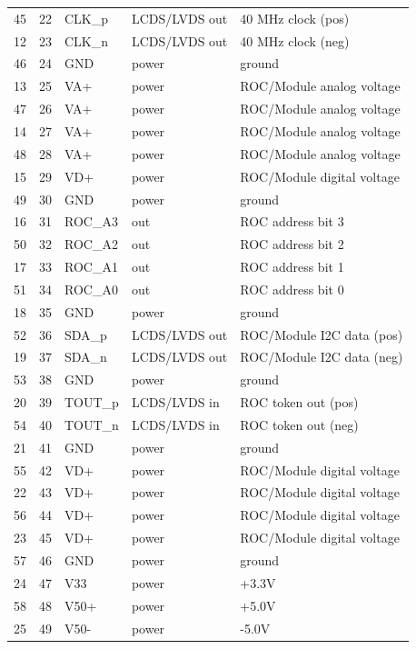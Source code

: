 \begin{table}[p]
{\begin{longtable}{cclll}
	    45 & 22 & CLK\_p & LCDS/LVDS out & 40 MHz clock (pos) \\ 
	    12 & 23 & CLK\_n & LCDS/LVDS out & 40 MHz clock (neg) \\ 
	    46 & 24 & GND & power & ground \\ 
	    13 & 25 & VA+ & power & ROC/Module analog voltage \\ 
	    47 & 26 & VA+ & power & ROC/Module analog voltage \\ 
	    14 & 27 & VA+ & power & ROC/Module analog voltage \\ 
	    48 & 28 & VA+ & power & ROC/Module analog voltage \\ 
	    15 & 29 & VD+ & power & ROC/Module digital voltage \\ 
	    49 & 30 & GND & power & ground \\ 
	    16 & 31 & ROC\_A3 & out & ROC address bit 3 \\ 
	    50 & 32 & ROC\_A2 & out & ROC address bit 2 \\ 
	    17 & 33 & ROC\_A1 & out & ROC address bit 1 \\ 
	    51 & 34 & ROC\_A0 & out & ROC address bit 0 \\ 
	    18 & 35 & GND & power & ground \\ 
	    52 & 36 & SDA\_p & LCDS/LVDS out & ROC/Module I2C data (pos) \\ 
	    19 & 37 & SDA\_n & LCDS/LVDS out & ROC/Module I2C data (neg) \\ 
	    53 & 38 & GND & power & ground \\ 
	    20 & 39 & TOUT\_p & LCDS/LVDS in & ROC token out (pos) \\ 
	    54 & 40 & TOUT\_n & LCDS/LVDS in & ROC token out (neg) \\ 
	    21 & 41 & GND & power & ground \\ 
	    55 & 42 & VD+ & power & ROC/Module digital voltage \\ 
	    22 & 43 & VD+ & power & ROC/Module digital voltage \\ 
	    56 & 44 & VD+ & power & ROC/Module digital voltage \\ 
	    23 & 45 & VD+ & power & ROC/Module digital voltage \\ 
	    57 & 46 & GND & power & ground \\ 
	    24 & 47 & V33 & power & +3.3V \\ 
	    58 & 48 & V50+ & power & +5.0V \\ 
	    25 & 49 & V50- & power & -5.0V \\ 

\end{longtable}}
\end{table}
